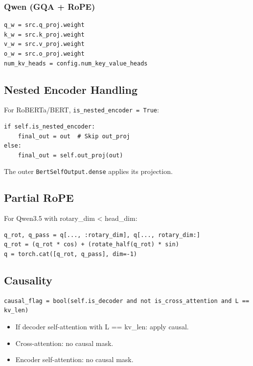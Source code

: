 \subsubsection{Qwen (GQA + RoPE)}
\begin{lstlisting}
q_w = src.q_proj.weight
k_w = src.k_proj.weight
v_w = src.v_proj.weight
o_w = src.o_proj.weight
num_kv_heads = config.num_key_value_heads
\end{lstlisting}

\subsection{Nested Encoder Handling}

For RoBERTa/BERT, \texttt{is\_nested\_encoder = True}:

\begin{lstlisting}
if self.is_nested_encoder:
    final_out = out  # Skip out_proj
else:
    final_out = self.out_proj(out)
\end{lstlisting}

The outer \texttt{BertSelfOutput.dense} applies its projection.

\subsection{Partial RoPE}

For Qwen3.5 with rotary\_dim < head\_dim:

\begin{lstlisting}
q_rot, q_pass = q[..., :rotary_dim], q[..., rotary_dim:]
q_rot = (q_rot * cos) + (rotate_half(q_rot) * sin)
q = torch.cat([q_rot, q_pass], dim=-1)
\end{lstlisting}

\subsection{Causality}

\begin{lstlisting}
causal_flag = bool(self.is_decoder and not is_cross_attention and L == kv_len)
\end{lstlisting}

\begin{itemize}
\item If decoder self-attention with L == kv\_len: apply causal.
\item Cross-attention: no causal mask.
\item Encoder self-attention: no causal mask.

\end{itemize}
